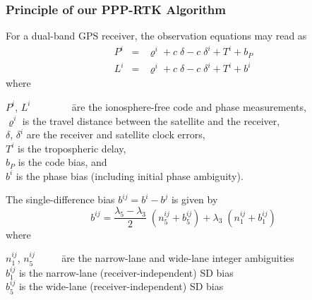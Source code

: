 \documentclass[10pt]{beamer}
\begin{document}
\begin{frame}
  \frametitle{Principle of our PPP-RTK Algorithm}
  For a dual-band GPS receiver, the observation equations may read as
  \begin{eqnarray*}
  P^i & = & \varrho^i + c\;\delta - c\;\delta^i + T^i + b_P              \\
  L^i & = & \varrho^i + c\;\delta - c\;\delta^i + T^i + b^i
  \end{eqnarray*}
  where
  \begin{tabbing}
  $P^i$, $L^i$ ~~~~~~~ \= are the ionosphere-free code and phase measurements, \\ 
  $\varrho^i$          \> is the travel distance between the satellite 
                          and the receiver,                               \\
  $\delta$, $\delta^i$ \> are the receiver and satellite clock errors,    \\
  $T^i$                \> is the tropospheric delay,                      \\
  $b_P$                \> is the code bias, and                           \\
  $b^i$                \> is the phase bias (including initial
                          phase ambiguity).
  \end{tabbing}
  The single-difference bias $b^{ij} = b^i - b^j$ is given by
  \begin{displaymath}
  b^{ij} = \displaystyle\frac{\lambda_5-\lambda_3}{2}\;(n_5^{ij} + b_5^{ij})
              + \lambda_3\;(n_1^{ij} + b_1^{ij}) 
  \end{displaymath}
   where
  \begin{tabbing}
  $n_1^{ij}$, $n_5^{ij}$ ~~~~ \= are the narrow-lane and wide-lane integer ambiguities \\
  $b_1^{ij}$                 \> is the narrow-lane (receiver-independent) SD bias \\
  $b_5^{ij}$                 \> is the wide-lane (receiver-independent) SD bias
  \end{tabbing}
\end{frame}

\end{document}
